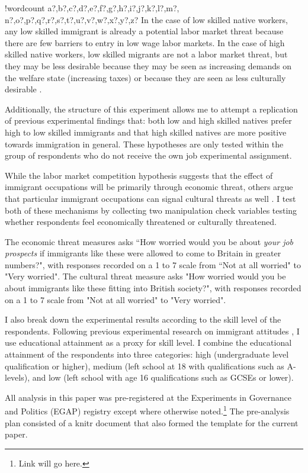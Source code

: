 \documentclass{article}\usepackage[]{graphicx}\usepackage[]{color}
\newcounter{words}
\newenvironment{counted}{%
\setcounter{words}{0}
\SearchList!{wordcount}{\stepcounter{words}}
{a?,b?,c?,d?,e?,f?,g?,h?,i?,j?,k?,l?,m?,
n?,o?,p?,q?,r?,s?,t?,u?,v?,w?,x?,y?,z?}
\UndoBoundary{'}
\SearchOrder{p;}}{%
\StopSearching}
\begin{document}
\begin{counted}
In the case of low skilled native workers, any low skilled immigrant is already a potential labor market threat because there are few barriers to entry in low wage labor markets. In the case of high skilled native workers, low skilled migrants are not a labor market threat, but they may be less desirable because they may be seen as increasing demands on the welfare state (increasing taxes) or because they are seen as less culturally desirable \autocite{Hainmueller2015a}.

Additionally, the structure of this experiment allows me to attempt a replication of previous experimental findings that: both low and high skilled natives prefer high to low skilled immigrants and that high skilled natives are more positive towards immigration in general. These hypotheses are only tested within the group of respondents who do not receive the own job experimental assignment.

While the labor market competition hypothesis suggests that the effect of immigrant occupations will be primarily through economic threat, others  argue that particular immigrant occupations can signal cultural threats as well \autocite{Hainmueller2015a}. I test both of these mechanisms by collecting two manipulation check variables testing whether respondents feel economically threatened or culturally threatened.   

The economic threat measures asks ``How worried would you be about \textit{your job prospects} if  immigrants like these were allowed to come to Britain in greater numbers?", with responses recorded on a 1 to 7 scale from ``Not at all worried" to "Very worried". The cultural threat measure asks "How worried would you be about immigrants like these fitting into British society?", with responses recorded on a 1 to 7 scale from "Not at all worried" to "Very worried".

I also break down the experimental results according to the skill level of the respondents. Following previous experimental research on immigrant attitudes \autocite{Hainmueller2015a, Hainmueller2010}, I use educational attainment as a proxy for skill level. I combine the educational attainment of the respondents into three categories: high (undergraduate level qualification or higher), medium (left school at 18 with qualifications such as A-levels), and low (left school with age 16 qualifications such as GCSEs or lower).

All analysis in this paper was pre-registered at the Experiments in Governance and Politics (EGAP) registry except where otherwise noted.\footnote{Link will go here.} The pre-analysis plan consisted of a knitr document that also formed the template for the current paper.


\end{counted}
\end{document}
